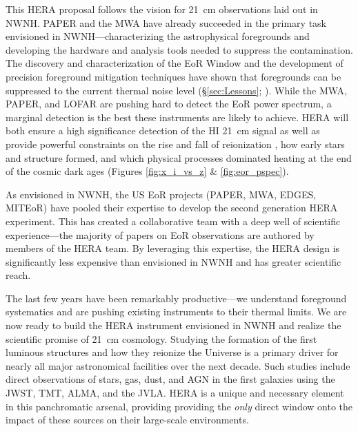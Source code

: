 \documentclass[preprint]{aastex}
\def\HI{{H{\small I }}}
\begin{document}
This HERA proposal follows the vision for 21~cm observations laid out in NWNH.
PAPER and the MWA have already succeeded in the primary task envisioned in
NWNH---characterizing the astrophysical foregrounds and developing the hardware
and analysis 
tools needed to suppress the contamination. The discovery and
characterization of the EoR Window and the development of precision foreground
mitigation techniques have shown that foregrounds can be suppressed to the current
thermal noise level (\S \ref{sec:Lessons}; \citealt{parsons_et_al2013}). While the MWA,
PAPER, and LOFAR are pushing hard to detect the EoR power spectrum, %
a marginal detection is the best these instruments are likely to achieve.
HERA will both ensure a high significance detection of the \HI 21~cm 
signal as
well as provide powerful constraints on the rise and fall of reionization \citep{pober_et_al2014}, how
early stars and structure formed, and which physical processes dominated heating at the end of the
cosmic dark ages (Figures \ref{fig:x_i_vs_z} \& \ref{fig:eor_pspec}).

As envisioned in NWNH, the US EoR projects (PAPER, MWA, EDGES, MITEoR) have
pooled their expertise to develop the second generation HERA experiment. This
has created a collaborative team with a deep well of scientific
experience---the majority of papers on EoR observations are authored by members
of the HERA team. By leveraging this expertise, the HERA design is significantly
less expensive than envisioned in 
NWNH and has greater scientific reach.

The last few years have been remarkably productive---we
understand foreground systematics and are pushing 
existing
instruments to their thermal limits. We are now ready to build the HERA
instrument envisioned in NWNH and realize the scientific promise of 21~cm
cosmology.
Studying the formation of the first luminous structures 
and how they reionize the Universe is a primary driver for 
nearly all major astronomical facilities over the next decade.
Such studies include direct 
observations of stars, gas, dust, and AGN in the
first galaxies using the JWST, TMT, ALMA, and the JVLA. HERA is 
a unique and necessary element in this panchromatic arsenal, providing
providing the \emph{only} direct window onto the impact of these sources on 
their large-scale environments.


\clearpage
\setcounter{page}{1}
\thispagestyle{empty}
%
%

%

\end{document}
